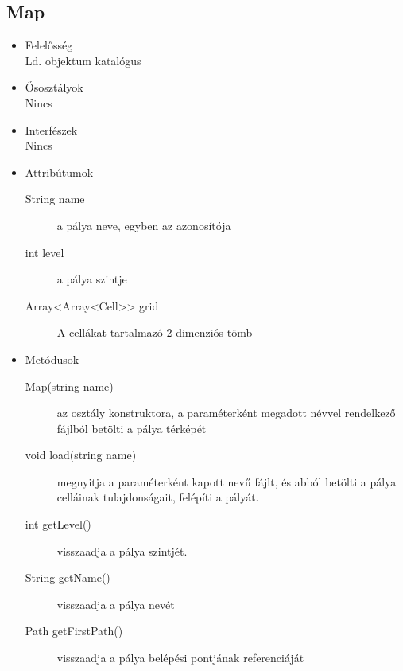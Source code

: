 \subsection{Map}
\begin{itemize}
\item Felelősség\\
Ld. objektum katalógus
\item Ősosztályok\\
Nincs
\item Interfészek\\
Nincs
\item Attribútumok\\
	\begin{description}
		\item[String name] a pálya neve, egyben az azonosítója
		\item[int level] a pálya szintje
		\item[Array<Array<Cell>> grid] A cellákat tartalmazó 2 dimenziós tömb

		
	\end{description}
\item Metódusok\\
	\begin{description}
		
		\item[Map(string name)] az osztály konstruktora, a paraméterként megadott névvel rendelkező fájlból betölti a pálya térképét
\item[void load(string name)] megnyitja a paraméterként kapott nevű fájlt, és abból betölti a pálya celláinak tulajdonságait, felépíti a pályát.
\item[int getLevel()] visszaadja a pálya szintjét.
\item[String getName()] visszaadja a pálya nevét
\item[Path getFirstPath()] visszaadja a pálya belépési pontjának referenciáját

		
		
	\end{description}
\end{itemize}
